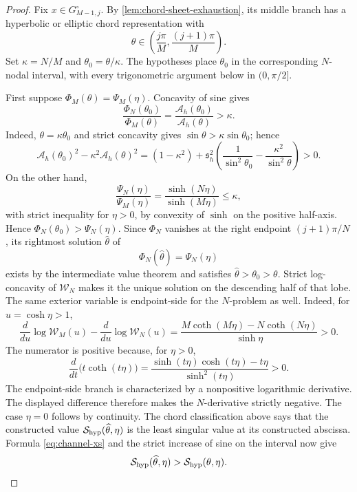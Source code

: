 \documentclass[a4paper,preprint,12pt,nopreprintline,sort&compress]{elsarticle}
\numberwithin{equation}{section}
\theoremstyle{remark}
\begin{document}
\begin{proof}
Fix \(x\in G_{M-1,j}^{\circ}\).  By
\cref{lem:chord-sheet-exhaustion}, its middle branch has a hyperbolic or
elliptic chord representation with
\[
 \theta\in\left(\frac{j\pi}{M},\frac{(j+1)\pi}{M}\right).
\]
Set \(\kappa=N/M\) and \(\theta_0=\theta/\kappa\).  The hypotheses place
\(\theta_0\) in the corresponding \(N\)-nodal interval, with every
trigonometric argument below in \((0,\pi/2]\).

First suppose \(\Phi_M(\theta)=\Psi_M(\eta)\).  Concavity of sine gives
\begin{equation}\label{eq:Phi-scale}
 \frac{\Phi_N(\theta_0)}{\Phi_M(\theta)}
 =\frac{\mathcal A_h(\theta_0)}{\mathcal A_h(\theta)}>\kappa.
\end{equation}
Indeed, \(\theta=\kappa\theta_0\) and strict concavity gives
\(\sin\theta>\kappa\sin\theta_0\); hence
\[
 \mathcal A_h(\theta_0)^2-\kappa^2\mathcal A_h(\theta)^2
 =(1-\kappa^2)+\mathfrak s_h^2\left(
 \frac1{\sin^2\theta_0}-\frac{\kappa^2}{\sin^2\theta}
 \right)>0.
\]
On the other hand,
\begin{equation}\label{eq:Psi-scale}
 \frac{\Psi_N(\eta)}{\Psi_M(\eta)}
 =\frac{\sinh(N\eta)}{\sinh(M\eta)}\leq\kappa,
\end{equation}
with strict inequality for \(\eta>0\), by convexity of \(\sinh\) on
the positive half-axis.  Hence
\(\Phi_N(\theta_0)>\Psi_N(\eta)\).  Since \(\Phi_N\) vanishes at the right
endpoint \((j+1)\pi/N\), its rightmost solution
\(\widehat\theta\) of
\[
 \Phi_N(\widehat\theta)=\Psi_N(\eta)
\]
exists by the intermediate value theorem and satisfies
\(\widehat\theta>\theta_0>\theta\).  Strict log-concavity of
\(\mathcal W_N\) makes it the unique solution on the descending half
of that lobe.  The same exterior
variable is endpoint-side for the \(N\)-problem as well.  Indeed, for
\(u=\cosh\eta>1\),
\[
 \frac{d}{du}\log\mathcal W_M(u)-
 \frac{d}{du}\log\mathcal W_N(u)
 =\frac{M\coth(M\eta)-N\coth(N\eta)}{\sinh\eta}>0.
\]
The numerator is positive because, for \(\eta>0\),
\[
 \frac{d}{dt}\bigl(t\coth(t\eta)\bigr)
 =\frac{\sinh(t\eta)\cosh(t\eta)-t\eta}{\sinh^2(t\eta)}>0.
\]
The endpoint-side branch is characterized by a nonpositive logarithmic
derivative.  The displayed difference therefore makes the
\(N\)-derivative strictly negative.  The case \(\eta=0\) follows by
continuity.
The chord classification above says that the constructed value
\(\mathcal S_{\rm hyp}(\widehat\theta,\eta)\) is the least singular
value at its constructed abscissa.  Formula
\eqref{eq:channel-xs} and the strict increase of sine on the interval
now give
\begin{equation}\label{eq:hyper-height-increase}
 \mathcal S_{\rm hyp}(\widehat\theta,\eta)
 >\mathcal S_{\rm hyp}(\theta,\eta).
\end{equation}


\end{proof}
\end{document}
